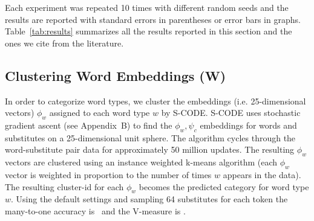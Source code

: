 Each experiment was repeated 10 times with different random seeds and
the results are reported with standard errors in parentheses or error
bars in graphs.  Table~\ref{tab:results} summarizes all the results
reported in this section and the ones we cite from the literature.

\subsection{Clustering Word Embeddings ({\bf W})}
\label{sec:clustering-w}

In order to categorize word types, we cluster the embeddings
(i.e. 25-dimensional vectors) $\phi_w$ assigned to each word type $w$
by S-CODE.  S-CODE uses stochastic gradient ascent (see Appendix~B) to
find the $\phi_w, \psi_c$ embeddings for words and substitutes on a
25-dimensional unit sphere.  The algorithm cycles through the
word-substitute pair data for approximately 50 million updates.  The
resulting $\phi_w$ vectors are clustered using an instance weighted
k-means algorithm (each $\phi_w$ vector is weighted in proportion to
the number of times $w$ appears in the data).  The resulting
cluster-id for each $\phi_w$ becomes the predicted category for word
type $w$.  Using the default settings and sampling 64 substitutes for
each token the many-to-one accuracy is \wsmto\ and the V-measure is
\wsvm.

